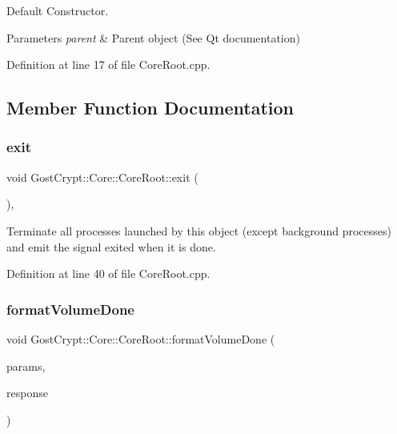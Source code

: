 Default Constructor. 


\begin{DoxyParams}{Parameters}
{\em parent} & Parent object (See Qt documentation) \\
\hline
\end{DoxyParams}


Definition at line 17 of file Core\+Root.\+cpp.



\subsection{Member Function Documentation}
\mbox{\label{class_gost_crypt_1_1_core_1_1_core_root_a9f12475644030457c3e111b57732ba45}} 
\subsubsection{\texorpdfstring{exit}{exit}}
{\footnotesize\ttfamily void Gost\+Crypt\+::\+Core\+::\+Core\+Root\+::exit (\begin{DoxyParamCaption}{ }\end{DoxyParamCaption})\hspace{0.3cm}{\ttfamily [virtual]}, {\ttfamily [slot]}}



Terminate all processes launched by this object (except background processes) and emit the signal exited when it is done. 



Definition at line 40 of file Core\+Root.\+cpp.

\mbox{\label{class_gost_crypt_1_1_core_1_1_core_root_a67efc84625566c7bc82313a317b73943}} 
\subsubsection{\texorpdfstring{format\+Volume\+Done}{formatVolumeDone}}
{\footnotesize\ttfamily void Gost\+Crypt\+::\+Core\+::\+Core\+Root\+::format\+Volume\+Done (\begin{DoxyParamCaption}\item[{Q\+Shared\+Pointer$<$ \hyperlink{struct_gost_crypt_1_1_core_1_1_create_volume_request}{Create\+Volume\+Request} $>$}]{params,  }\item[{Q\+Shared\+Pointer$<$ \hyperlink{struct_gost_crypt_1_1_core_1_1_create_volume_response}{Create\+Volume\+Response} $>$}]{response }\end{DoxyParamCaption})\hspace{0.3cm}{\ttfamily [signal]}}



